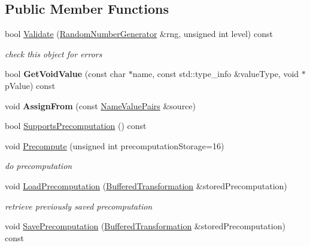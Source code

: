 \subsection*{Public Member Functions}
\begin{DoxyCompactItemize}
\item 
bool \hyperlink{class_d_l___public_key_impl_a85fab6591b1420642f414d6d9669b298}{Validate} (\hyperlink{class_random_number_generator}{RandomNumberGenerator} \&rng, unsigned int level) const 
\begin{DoxyCompactList}\small\item\em check this object for errors \item\end{DoxyCompactList}\item 
\hypertarget{class_d_l___public_key_impl_a690117c9f7e11d6f291c34a4cb6046ff}{
bool {\bfseries GetVoidValue} (const char $\ast$name, const std::type\_\-info \&valueType, void $\ast$pValue) const }
\label{class_d_l___public_key_impl_a690117c9f7e11d6f291c34a4cb6046ff}

\item 
\hypertarget{class_d_l___public_key_impl_afa2dcb7fc8d0d83dd6d4563b7ba6ca41}{
void {\bfseries AssignFrom} (const \hyperlink{class_name_value_pairs}{NameValuePairs} \&source)}
\label{class_d_l___public_key_impl_afa2dcb7fc8d0d83dd6d4563b7ba6ca41}

\item 
bool \hyperlink{class_d_l___public_key_impl_a16711647065fe1c20f118460646ccc38}{SupportsPrecomputation} () const 
\item 
void \hyperlink{class_d_l___public_key_impl_a95e25f6632ec2621289d10abc557b17b}{Precompute} (unsigned int precomputationStorage=16)
\begin{DoxyCompactList}\small\item\em do precomputation \item\end{DoxyCompactList}\item 
\hypertarget{class_d_l___public_key_impl_a8f1379edc09486d79c3ad6c374d01243}{
void \hyperlink{class_d_l___public_key_impl_a8f1379edc09486d79c3ad6c374d01243}{LoadPrecomputation} (\hyperlink{class_buffered_transformation}{BufferedTransformation} \&storedPrecomputation)}
\label{class_d_l___public_key_impl_a8f1379edc09486d79c3ad6c374d01243}

\begin{DoxyCompactList}\small\item\em retrieve previously saved precomputation \item\end{DoxyCompactList}\item 
\hypertarget{class_d_l___public_key_impl_a61ebc126c2ed4db8e8bb34c0b32bc4d0}{
void \hyperlink{class_d_l___public_key_impl_a61ebc126c2ed4db8e8bb34c0b32bc4d0}{SavePrecomputation} (\hyperlink{class_buffered_transformation}{BufferedTransformation} \&storedPrecomputation) const }
\label{class_d_l___public_key_impl_a61ebc126c2ed4db8e8bb34c0b32bc4d0}


\end{DoxyCompactItemize}
